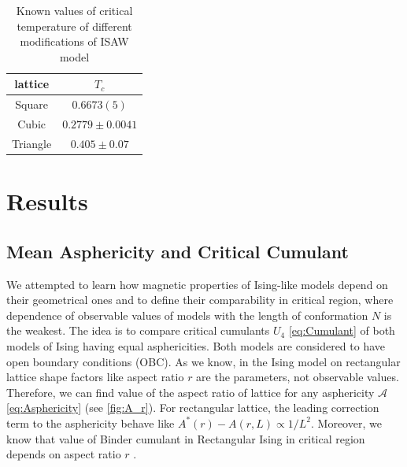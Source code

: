 \documentclass[a4paper]{jpconf}
\begin{document}
\begin{table}[h]
    \centering
    \begin{tabular}{|c|c|}
        \hline
        lattice & $T_{c}$ \\ \hline
        Square & $0.6673(5)$ \cite{Caracciolo2011} \\ \hline
        Cubic & $0.2779 \pm 0.0041$\cite{Tesi1996} \\ \hline
        Triangle & $ 0.405 \pm 0.07$\cite{Privman1986} \\ \hline
    \end{tabular}
    \caption{Known values of critical temperature of different modifications of ISAW model}
    \label{tab:ISAW_T_c}
\end{table}




\section{Results}


\subsection{Mean Asphericity and Critical Cumulant}


We attempted to learn how magnetic properties of Ising-like models depend on their geometrical ones and to define their comparability in critical region, where dependence of observable values of models with the length of conformation $N$ is the weakest. The idea is to compare critical cumulants $U_{4}$ \eqref{eq:Cumulant} of both models of Ising having equal asphericities. Both models are considered to have open boundary conditions (OBC). As we know, in the Ising model on rectangular lattice shape factors like aspect ratio $r$ are the parameters, not observable values. Therefore, we can find value of the aspect ratio of lattice for any asphericity $\mathcal{A}$ \eqref{eq:Asphericity} (see \cref{fig:A_r}). For rectangular lattice, the leading correction term to the asphericity behave like $A^{*}(r) - A(r, L) \propto 1 / L^{2}$. Moreover, we know that value of Binder cumulant in Rectangular Ising in critical region depends on aspect ratio $r$ \cite{Selke2006}. 
\end{document}
